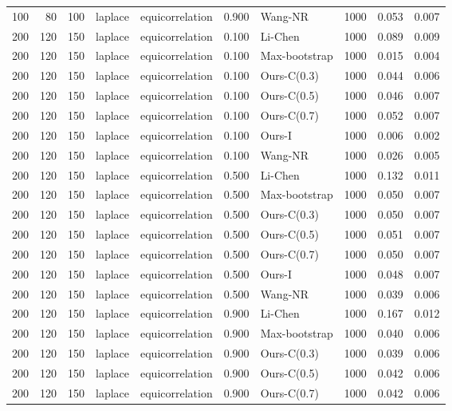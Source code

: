 \begin{tabular}{rrrllrlrrr}
100 & 80 & 100 & laplace & equicorrelation & 0.900 & Wang-NR & 1000 & 0.053 & 0.007 \\
200 & 120 & 150 & laplace & equicorrelation & 0.100 & Li-Chen & 1000 & 0.089 & 0.009 \\
200 & 120 & 150 & laplace & equicorrelation & 0.100 & Max-bootstrap & 1000 & 0.015 & 0.004 \\
200 & 120 & 150 & laplace & equicorrelation & 0.100 & Ours-C(0.3) & 1000 & 0.044 & 0.006 \\
200 & 120 & 150 & laplace & equicorrelation & 0.100 & Ours-C(0.5) & 1000 & 0.046 & 0.007 \\
200 & 120 & 150 & laplace & equicorrelation & 0.100 & Ours-C(0.7) & 1000 & 0.052 & 0.007 \\
200 & 120 & 150 & laplace & equicorrelation & 0.100 & Ours-I & 1000 & 0.006 & 0.002 \\
200 & 120 & 150 & laplace & equicorrelation & 0.100 & Wang-NR & 1000 & 0.026 & 0.005 \\
200 & 120 & 150 & laplace & equicorrelation & 0.500 & Li-Chen & 1000 & 0.132 & 0.011 \\
200 & 120 & 150 & laplace & equicorrelation & 0.500 & Max-bootstrap & 1000 & 0.050 & 0.007 \\
200 & 120 & 150 & laplace & equicorrelation & 0.500 & Ours-C(0.3) & 1000 & 0.050 & 0.007 \\
200 & 120 & 150 & laplace & equicorrelation & 0.500 & Ours-C(0.5) & 1000 & 0.051 & 0.007 \\
200 & 120 & 150 & laplace & equicorrelation & 0.500 & Ours-C(0.7) & 1000 & 0.050 & 0.007 \\
200 & 120 & 150 & laplace & equicorrelation & 0.500 & Ours-I & 1000 & 0.048 & 0.007 \\
200 & 120 & 150 & laplace & equicorrelation & 0.500 & Wang-NR & 1000 & 0.039 & 0.006 \\
200 & 120 & 150 & laplace & equicorrelation & 0.900 & Li-Chen & 1000 & 0.167 & 0.012 \\
200 & 120 & 150 & laplace & equicorrelation & 0.900 & Max-bootstrap & 1000 & 0.040 & 0.006 \\
200 & 120 & 150 & laplace & equicorrelation & 0.900 & Ours-C(0.3) & 1000 & 0.039 & 0.006 \\
200 & 120 & 150 & laplace & equicorrelation & 0.900 & Ours-C(0.5) & 1000 & 0.042 & 0.006 \\
200 & 120 & 150 & laplace & equicorrelation & 0.900 & Ours-C(0.7) & 1000 & 0.042 & 0.006 \\

\end{tabular}
